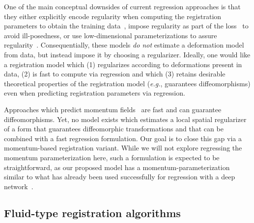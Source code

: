 \documentclass[10pt,twocolumn,letterpaper,table]{article}
\numberwithin{equation}{section}
\theoremstyle{plain}
\theoremstyle{definition}
\def\eg{\emph{e.g.}}  \def\Eg{\emph{E.g.}}
\begin{document}
One of the main conceptual downsides of current regression approaches is that they either explicitly encode regularity when computing the registration parameters to obtain the training data~\cite{yang2016fast,yang2017quicksilver,rohe2017svf}, impose regularity as part of the loss~\cite{hu2018label,balakrishnan2018unsupervised,fan2018adversarial} to avoid ill-posedness, or use low-dimensional parameterizations to assure regularity~\cite{sokooti2017nonrigid,de2017end}. Consequentially, these models \emph{do not} estimate a deformation model from data, but instead impose it by choosing a regularizer. Ideally, one would like a registration model which (1) regularizes according to deformations present in data, (2) is fast to compute via regression and which (3) retains desirable theoretical properties of the registration model (\eg, guarantees diffeomorphisms) even when predicting registration parameters via regression.

Approaches which predict momentum fields~\cite{yang2016fast,yang2017quicksilver} are fast and can guarantee diffeomorphisms. Yet, no model exists which estimates a local spatial regularizer of a form that guarantees diffeomorphic transformations and that can be combined with a fast regression formulation. Our goal is to close this gap via a momentum-based registration variant. While we will not explore regressing the momentum parameterization here, such a formulation is expected to be straightforward, as our proposed model has a momentum-parameterization similar to what has already been used successfully for regression with a deep network~\cite{yang2017quicksilver}.

\subsection{Fluid-type registration algorithms}
\label{subsection:fluid_registration}
\end{document}

